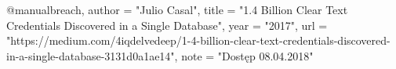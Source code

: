 @manual{breach,
    author = "Julio Casal",
    title = "1.4 Billion Clear Text Credentials Discovered in a Single Database",
    year = "2017",
    url = "https://medium.com/4iqdelvedeep/1-4-billion-clear-text-credentials-discovered-in-a-single-database-3131d0a1ae14",
    note = "Dostęp 08.04.2018"
}
